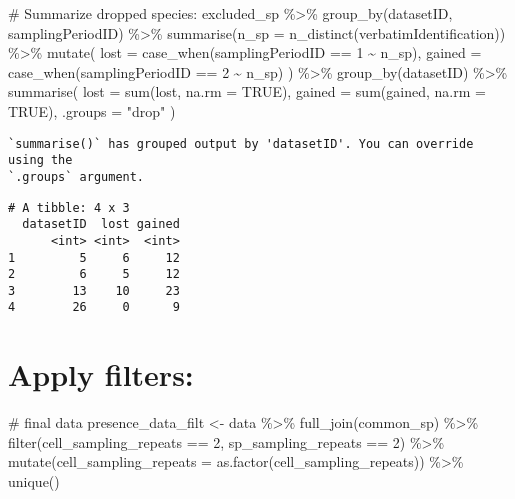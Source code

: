 \documentclass[
  letterpaper,
  DIV=11,
  numbers=noendperiod]{scrreprt}
\newenvironment{Shaded}{\begin{snugshade}}{\end{snugshade}}
\newcommand{\AttributeTok}[1]{\textcolor[rgb]{0.40,0.45,0.13}{#1}}
\newcommand{\CommentTok}[1]{\textcolor[rgb]{0.37,0.37,0.37}{#1}}
\newcommand{\ConstantTok}[1]{\textcolor[rgb]{0.56,0.35,0.01}{#1}}
\newcommand{\DecValTok}[1]{\textcolor[rgb]{0.68,0.00,0.00}{#1}}
\newcommand{\FunctionTok}[1]{\textcolor[rgb]{0.28,0.35,0.67}{#1}}
\newcommand{\NormalTok}[1]{\textcolor[rgb]{0.00,0.23,0.31}{#1}}
\newcommand{\OtherTok}[1]{\textcolor[rgb]{0.00,0.23,0.31}{#1}}
\newcommand{\SpecialCharTok}[1]{\textcolor[rgb]{0.37,0.37,0.37}{#1}}
\newcommand{\StringTok}[1]{\textcolor[rgb]{0.13,0.47,0.30}{#1}}
\begin{document}
\begin{Shaded}
\begin{Highlighting}[]
\CommentTok{\# Summarize dropped species:}
\NormalTok{excluded\_sp }\SpecialCharTok{\%\textgreater{}\%}
  \FunctionTok{group\_by}\NormalTok{(datasetID, samplingPeriodID) }\SpecialCharTok{\%\textgreater{}\%}
  \FunctionTok{summarise}\NormalTok{(}\AttributeTok{n\_sp =} \FunctionTok{n\_distinct}\NormalTok{(verbatimIdentification)) }\SpecialCharTok{\%\textgreater{}\%}
  \FunctionTok{mutate}\NormalTok{(}
    \AttributeTok{lost =} \FunctionTok{case\_when}\NormalTok{(samplingPeriodID }\SpecialCharTok{==} \DecValTok{1} \SpecialCharTok{\textasciitilde{}}\NormalTok{ n\_sp),}
    \AttributeTok{gained =} \FunctionTok{case\_when}\NormalTok{(samplingPeriodID }\SpecialCharTok{==} \DecValTok{2} \SpecialCharTok{\textasciitilde{}}\NormalTok{ n\_sp)}
\NormalTok{  ) }\SpecialCharTok{\%\textgreater{}\%}
  \FunctionTok{group\_by}\NormalTok{(datasetID) }\SpecialCharTok{\%\textgreater{}\%}
  \FunctionTok{summarise}\NormalTok{(}
    \AttributeTok{lost =} \FunctionTok{sum}\NormalTok{(lost, }\AttributeTok{na.rm =} \ConstantTok{TRUE}\NormalTok{),}
    \AttributeTok{gained =} \FunctionTok{sum}\NormalTok{(gained, }\AttributeTok{na.rm =} \ConstantTok{TRUE}\NormalTok{),}
    \AttributeTok{.groups =} \StringTok{"drop"}
\NormalTok{  )}
\end{Highlighting}
\end{Shaded}

\begin{verbatim}
`summarise()` has grouped output by 'datasetID'. You can override using the
`.groups` argument.
\end{verbatim}

\begin{verbatim}
# A tibble: 4 x 3
  datasetID  lost gained
      <int> <int>  <int>
1         5     6     12
2         6     5     12
3        13    10     23
4        26     0      9
\end{verbatim}

\hypertarget{apply-filters}{%
\section{Apply filters:}\label{apply-filters}}

\begin{Shaded}
\begin{Highlighting}[]
\CommentTok{\# final data}
\NormalTok{presence\_data\_filt }\OtherTok{\textless{}{-}}\NormalTok{ data }\SpecialCharTok{\%\textgreater{}\%}
  \FunctionTok{full\_join}\NormalTok{(common\_sp) }\SpecialCharTok{\%\textgreater{}\%}
  \FunctionTok{filter}\NormalTok{(cell\_sampling\_repeats }\SpecialCharTok{==} \DecValTok{2}\NormalTok{, sp\_sampling\_repeats }\SpecialCharTok{==} \DecValTok{2}\NormalTok{) }\SpecialCharTok{\%\textgreater{}\%}
  \FunctionTok{mutate}\NormalTok{(}\AttributeTok{cell\_sampling\_repeats =} \FunctionTok{as.factor}\NormalTok{(cell\_sampling\_repeats)) }\SpecialCharTok{\%\textgreater{}\%}
  \FunctionTok{unique}\NormalTok{()}
\end{Highlighting}
\end{Shaded}
\end{document}
